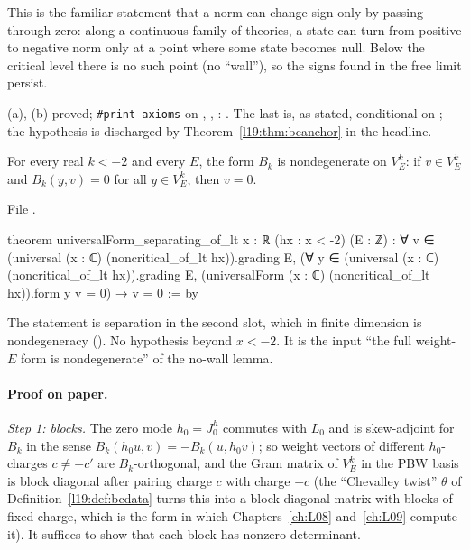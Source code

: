 \begin{physics}
This is the familiar statement that a norm can change sign only by passing through zero: along a continuous family of
theories, a state can turn from positive to negative norm only at a point where some state becomes null. Below the
critical level there is no such point (no ``wall''), so the signs found in the free limit persist.
\end{physics}

\begin{status}
(a), (b) proved; \texttt{\#print axioms} on , ,
: . The last is,
as stated, conditional on ; the hypothesis is discharged by Theorem~\ref{l19:thm:bcanchor} in the
headline.
\end{status}

\begin{theorem}\label{l19:thm:bcnondeg}
For every real $k<-2$ and every $E$, the form $B_k$ is nondegenerate on $V^k_E$: if $v\in V^k_E$ and $B_k(y,v) = 0$
for all $y\in V^k_E$, then $v = 0$.
\end{theorem}

{\raggedright\noindent File .\par}
\begin{leancode}
theorem universalForm_separating_of_lt {x : ℝ} (hx : x < -2) (E : ℤ) :
    ∀ v ∈ (universal (x : ℂ) (noncritical_of_lt hx)).grading E,
      (∀ y ∈ (universal (x : ℂ) (noncritical_of_lt hx)).grading E,
        (universalForm (x : ℂ) (noncritical_of_lt hx)).form y v = 0) → v = 0 := by
\end{leancode}

\begin{dictionary}
The statement is separation in the second slot, which in finite dimension is nondegeneracy
(). No hypothesis beyond $x<-2$. It is the input ``the full weight-$E$ form is
nondegenerate'' of the no-wall lemma.
\end{dictionary}

\paragraph{Proof on paper.} \emph{Step 1: blocks.} The zero mode $h_0 = J^h_0$ commutes with $L_0$ and is skew-adjoint for
$B_k$ in the sense $B_k(h_0u,v) = -B_k(u,h_0v)$; so weight vectors of different $h_0$-charges $c\ne -c'$ are $B_k$-orthogonal,
and the Gram matrix of $V^k_E$ in the PBW basis is block diagonal after pairing charge $c$ with charge $-c$ (the
``Chevalley twist'' $\theta$ of Definition~\ref{l19:def:bcdata} turns this into a block-diagonal matrix with blocks of
fixed charge, which is the form in which Chapters~\ref{ch:L08} and~\ref{ch:L09} compute it). It suffices to show that
each block has nonzero determinant.

